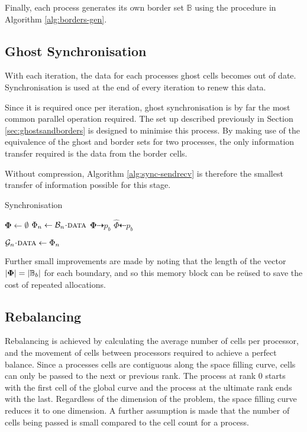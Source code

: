 \documentclass{IIBproject}
\newcommand{\vect}[1]{\bm{#1}}
\newcommand{\dra}{\dashrightarrow}
\newcommand{\dla}{\dashleftarrow}
\newcommand{\acc}{{\mkern 0.5mu\cdot\mkern 0.5mu}}
\begin{document}
Finally, each process generates its own border set $\mathbb{B}$ using the procedure in Algorithm \ref{alg:borders-gen}.


\subsection{Ghost Synchronisation}

With each iteration, the data for each processes ghost cells becomes out of date. Synchronisation is used at the end of every iteration to renew this data. 

Since it is required once per iteration, ghost synchronisation is by far the most common parallel operation required. The set up described previously in Section \ref{sec:ghostsandborders} is designed to minimise this process. By making use of the equivalence of the ghost and border sets for two processes, the only information transfer required is the data from the border cells.

Without compression, Algorithm \ref{alg:sync-sendrecv} is therefore the smallest transfer of information possible for this stage.

\begin{algorithm}[H]
\caption{Synchronisation}
\label{alg:sync-sendrecv}

\begin{algorithmic}
	\State $\vect{\Phi} \gets \emptyset$
		\State $\Phi_n \gets \mathcal{B}_n\acc\textproc{data}$
	\EndFor
	\Send $\vect{\Phi} \dra p_b$
\EndFor
\Statex
{}
	\Recv $\hat \Phi \dla p_b$

		\State $\mathcal{G}_n\acc\textproc{data} \gets \Phi_n$
	\EndFor
\EndFor
\end{algorithmic}
\end{algorithm}

Further small improvements are made by noting that the length of the vector $\abs{\vect{\Phi}} = \abs{\mathbb{B}_b}$ for each boundary, and so this memory block can be re\"used to save the cost of repeated allocations. 


\subsection{Rebalancing}

Rebalancing is achieved by calculating the average number of cells per processor, and the movement of cells between processors required to achieve a perfect balance. Since a processes cells are contiguous along the space filling curve, cells can only be passed to the next or previous rank. The process at rank 0 starts with the first cell of the global curve and the process at the ultimate rank ends with the last. Regardless of the dimension of the problem, the space filling curve reduces it to one dimension. A further assumption is made that the number of cells being passed is small compared to the cell count for a process. 
\end{document}
